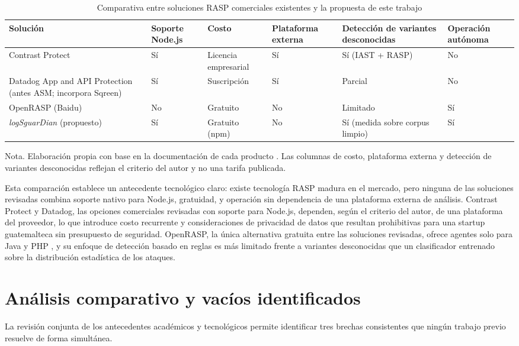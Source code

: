 \begin{table}[h]
\small
\begin{tabular}{|p{2.4cm}|p{1.6cm}|p{2cm}|p{1.8cm}|p{2.6cm}|p{1.8cm}|}
\hline
\textbf{Solución} & \textbf{Soporte Node.js} & \textbf{Costo} & \textbf{Plataforma externa} & \textbf{Detección de variantes desconocidas} & \textbf{Operación autónoma} \\ \hline
Contrast Protect \cite{contrastsecurity} & Sí & Licencia empresarial & Sí & Sí (IAST + RASP) & No \\ \hline
Datadog App and API Protection (antes ASM; incorpora Sqreen) \cite{datadog2026nodejs,datadog2021sqreen} & Sí & Suscripción & Sí & Parcial & No \\ \hline
OpenRASP (Baidu) \cite{baidu2026openrasp} & No & Gratuito & No & Limitado & Sí \\ \hline
\textit{logSguarDian} (propuesto) & Sí & Gratuito (npm) & No & Sí (medida sobre corpus limpio) & Sí \\ \hline
\end{tabular}
\caption[Comparativa de soluciones RASP existentes]{Comparativa entre soluciones RASP comerciales existentes y la propuesta de este trabajo}
\label{cuadro:rasp}
\end{table}
{\footnotesize Nota. Elaboración propia con base en la documentación de cada producto
\cite{contrastsecurity,datadog2026nodejs,baidu2026openrasp}. Las columnas de costo, plataforma
externa y detección de variantes desconocidas reflejan el criterio del autor y no una tarifa
publicada.}

Esta comparación establece un antecedente tecnológico claro: existe tecnología RASP madura en
el mercado, pero ninguna de las soluciones revisadas combina soporte nativo para Node.js,
gratuidad, y operación sin dependencia de una plataforma externa de análisis. Contrast Protect y Datadog, las opciones comerciales revisadas con soporte para Node.js, dependen, según el criterio del autor, de una plataforma del proveedor, lo que introduce costo recurrente y consideraciones de
privacidad de datos que resultan prohibitivas para una startup guatemalteca sin presupuesto de
seguridad. OpenRASP, la única alternativa gratuita entre las soluciones revisadas, ofrece agentes solo para
Java y PHP \cite{baidu2026openrasp}, y su enfoque
de detección basado en reglas es más limitado frente a variantes desconocidas que un clasificador
entrenado sobre la distribución estadística de los ataques.

\section{Análisis comparativo y vacíos identificados}
La revisión conjunta de los antecedentes académicos y tecnológicos permite identificar tres brechas
consistentes que ningún trabajo previo resuelve de forma simultánea.

